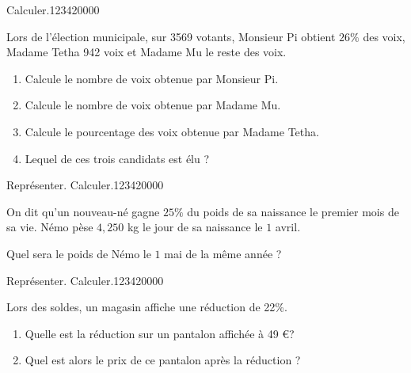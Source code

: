 \begin{pageAuto} 
 
\begin{ExoAuto}{Calculer.}{1234}{2}{0}{0}{0}{0}

Lors de l'élection municipale, sur 3569 votants, Monsieur Pi obtient $26\%$ des voix, Madame Tetha 942 voix et Madame Mu le reste des voix.

\begin{enumerate}[leftmargin=*]
\item Calcule le nombre de voix obtenue par Monsieur Pi. 
\item Calcule le nombre de voix obtenue par Madame Mu.  
\item Calcule le pourcentage des voix obtenue par Madame Tetha.  
\item Lequel de ces trois candidats est élu ?  
\end{enumerate}

 
\end{ExoAuto}


\begin{ExoAuto}{Représenter. Calculer.}{1234}{2}{0}{0}{0}{0}

On dit qu'un nouveau-né gagne $25\%$ du poids de sa naissance le premier mois de sa vie. Némo pèse $4,250$ kg le jour de sa naissance le $1$ avril.

Quel sera le poids de Némo le $1$ mai de la même année ?
  
\end{ExoAuto}


\begin{ExoAuto}{Représenter. Calculer.}{1234}{2}{0}{0}{0}{0}

Lors des soldes, un magasin affiche une réduction de 22\%. 
\begin{enumerate}[leftmargin=*]
\item Quelle est la réduction sur un pantalon affichée à 49 \euro ?
\item Quel est alors le prix de ce pantalon après la réduction ?
\end{enumerate}


\end{ExoAuto}
 
 
\end{pageAuto}
